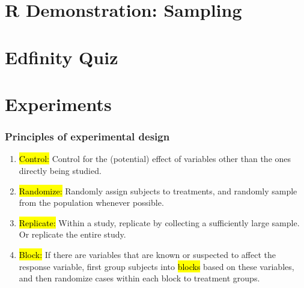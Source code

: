 \documentclass[slidestop,compress,mathserif]{beamer}
\begin{document}



\section{R Demonstration: Sampling}


\section{Edfinity Quiz}


\section{Experiments}


\begin{frame}
\frametitle{Principles of experimental design}

	\begin{enumerate}
		\item \hl{Control:} Control for the (potential) effect of variables other than the ones directly being studied.
		\item \hl{Randomize:} Randomly assign subjects to treatments, and randomly sample from the population whenever possible.
		\item \hl{Replicate:} Within a study, replicate by collecting a sufficiently large sample. Or replicate the entire study.
		\item \hl{Block:} If there are variables that are known or suspected to affect the response variable, first group subjects into \hl{blocks} based on these variables, and then randomize cases within each block to treatment groups.
	\end{enumerate}

\end{frame}
\end{document}
